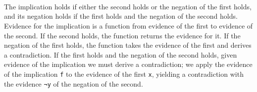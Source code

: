 \begin{fence}
\begin{code}%
\>[0]\AgdaSpace{}%
\AgdaSymbol{:}\AgdaSpace{}%
\AgdaSpace{}%
\AgdaSymbol{\{}\AgdaSpace{}%
\AgdaSpace{}%
\AgdaSymbol{:}\AgdaSpace{}%
\AgdaSymbol{\}}\AgdaSpace{}%
\AgdaSpace{}%
\AgdaSpace{}%
\AgdaSpace{}%
\AgdaSpace{}%
\AgdaSpace{}%
\AgdaSpace{}%
\AgdaSpace{}%
\AgdaSpace{}%
\AgdaSymbol{(}\AgdaSpace{}%
\AgdaSpace{}%
\AgdaSymbol{)}\<%
\\
\>[0]\AgdaSymbol{\AgdaUnderscore{}}%
\>[6]\AgdaSpace{}%
\AgdaSpace{}%
%
\>[19]\AgdaSymbol{=}%
\>[22]\AgdaSpace{}%
\AgdaSpace{}%
\AgdaBound{\AgdaUnderscore{}}\AgdaSpace{}%
\AgdaSpace{}%
\AgdaSymbol{)}\<%
\\
\>[0]\AgdaSpace{}%
\AgdaSpace{}%
\AgdaSpace{}%
\AgdaCatchallClause{\AgdaSymbol{\AgdaUnderscore{}}}%
\>[19]\AgdaSymbol{=}%
\>[22]\AgdaSpace{}%
\AgdaSpace{}%
\AgdaSpace{}%
\AgdaSpace{}%
\AgdaSpace{}%
\AgdaSymbol{(}\AgdaSpace{}%
\AgdaSymbol{))}\<%
\\
\>[0]\AgdaSpace{}%
\AgdaSpace{}%
\AgdaSpace{}%
\AgdaSpace{}%
%
\>[19]\AgdaSymbol{=}%
\>[22]\AgdaSpace{}%
\AgdaSpace{}%
\AgdaSpace{}%
\AgdaSpace{}%
\AgdaSpace{}%
\AgdaSymbol{(}\AgdaSpace{}%
\AgdaSymbol{))}\<%
\end{code}
\end{fence}

The implication holds if either the second holds or the negation of the
first holds, and its negation holds if the first holds and the negation
of the second holds. Evidence for the implication is a function from
evidence of the first to evidence of the second. If the second holds,
the function returns the evidence for it. If the negation of the first
holds, the function takes the evidence of the first and derives a
contradiction. If the first holds and the negation of the second holds,
given evidence of the implication we must derive a contradiction; we
apply the evidence of the implication \texttt{f} to the evidence of the
first \texttt{x}, yielding a contradiction with the evidence \texttt{¬y}
of the negation of the second.


